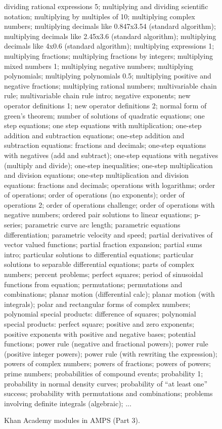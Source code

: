 \documentclass{article}
\begin{document}
\begin{figure*}
dividing rational expressions 5; multiplying and dividing scientific notation; multiplying by multiples of 10; multiplying complex numbers; multiplying decimals like 0.847x3.54 (standard algorithm); multiplying decimals like 2.45x3.6 (standard algorithm); multiplying decimals like 4x0.6 (standard algorithm); multiplying expressions 1; multiplying fractions; multiplying fractions by integers; multiplying mixed numbers 1; multiplying negative numbers; multiplying polynomials; multiplying polynomials 0.5; multiplying positive and negative fractions; multiplying rational numbers; multivariable chain rule; multivariable chain rule intro; negative exponents; new operator definitions 1; new operator definitions 2; normal form of green's theorem; number of solutions of quadratic equations; one step equations; one step equations with multiplication; one-step addition and subtraction equations; one-step addition and subtraction equations: fractions and decimals; one-step equations with negatives (add and subtract); one-step equations with negatives (multiply and divide); one-step inequalities; one-step multiplication and division equations; one-step multiplication and division equations: fractions and decimals; operations with logarithms; order of operations; order of operations (no exponents); order of operations 2; order of operations challenge; order of operations with negative numbers; ordered pair solutions to linear equations; p-series; parametric curve arc length; parametric equations differentiation; parametric velocity and speed; partial derivatives of vector valued functions; partial fraction expansion; partial sums intro; particular solutions to differential equations; particular solutions to separable differential equations; parts of complex numbers; percent problems; perfect squares; period of sinusoidal functions from equation; permutations; permutations and combinations; planar motion (differential calc); planar motion (with integrals); polar and rectangular forms of complex numbers; polynomial special products: difference of squares; polynomial special products: perfect square; positive and zero exponents; positive exponents with positive and negative bases; potential functions; power rule (negative and fractional powers); power rule (positive integer powers); power rule (with rewriting the expression); powers of complex numbers; powers of fractions; powers of powers; prime numbers; probabilities of compound events; probability 1; probability in normal density curves; probability of ``at least one'' success; probability with permutations and combinations; problems involving definite integrals (algebraic); ...
    \caption{Khan Academy modules in AMPS (Part 3).}
    \label{fig:khan3}
\end{figure*}
\end{document}
